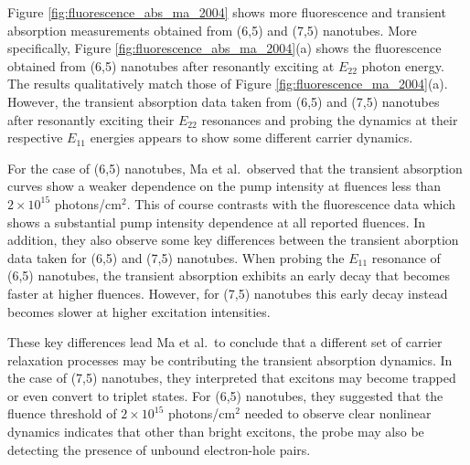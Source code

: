 Figure \ref{fig:fluorescence_abs_ma_2004} shows more fluorescence and transient absorption measurements obtained from (6,5) and (7,5) nanotubes. More specifically, Figure \ref{fig:fluorescence_abs_ma_2004}(a) shows the fluorescence obtained from (6,5) nanotubes after resonantly exciting at $E_{22}$ photon energy. The results qualitatively match those of Figure \ref{fig:fluorescence_ma_2004}(a). However, the transient absorption data taken from (6,5) and (7,5) nanotubes after resonantly exciting their $E_{22}$ resonances and probing the dynamics at their respective $E_{11}$ energies appears to show some different carrier dynamics.

For the case of (6,5) nanotubes, Ma et al.\ observed that the transient absorption curves show a weaker dependence on the pump intensity at fluences less than $2 \times 10^{15}$ photons/cm$^2$. This of course contrasts with the fluorescence data which shows a substantial pump intensity dependence at all reported fluences. In addition, they also observe some key differences between the transient aborption data taken for (6,5) and (7,5) nanotubes. When probing the $E_{11}$ resonance of (6,5) nanotubes, the transient absorption exhibits an early decay that becomes faster at higher fluences. However, for (7,5) nanotubes this early decay instead becomes slower at higher excitation intensities.

These key differences lead Ma et al.\ to conclude that a different set of carrier relaxation processes may be contributing the transient absorption dynamics. In the case of (7,5) nanotubes, they interpreted that excitons may become trapped or even convert to triplet states. For (6,5) nanotubes, they suggested that the fluence threshold of $2 \times 10^{15}$ photons/cm$^2$ needed to observe clear nonlinear dynamics indicates that other than bright excitons, the probe may also be detecting the presence of unbound electron-hole pairs.

